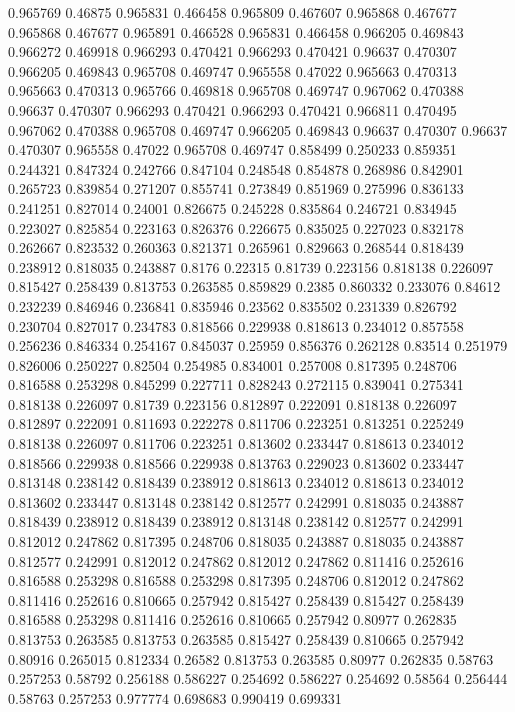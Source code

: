 0.965769 0.46875
0.965831 0.466458
0.965809 0.467607
0.965868 0.467677
0.965868 0.467677
0.965891 0.466528
0.965831 0.466458
0.966205 0.469843
0.966272 0.469918
0.966293 0.470421
0.966293 0.470421
0.96637 0.470307
0.966205 0.469843
0.965708 0.469747
0.965558 0.47022
0.965663 0.470313
0.965663 0.470313
0.965766 0.469818
0.965708 0.469747
0.967062 0.470388
0.96637 0.470307
0.966293 0.470421
0.966293 0.470421
0.966811 0.470495
0.967062 0.470388
0.965708 0.469747
0.966205 0.469843
0.96637 0.470307
0.96637 0.470307
0.965558 0.47022
0.965708 0.469747
0.858499 0.250233
0.859351 0.244321
0.847324 0.242766
0.847104 0.248548
0.854878 0.268986
0.842901 0.265723
0.839854 0.271207
0.855741 0.273849
0.851969 0.275996
0.836133 0.241251
0.827014 0.24001
0.826675 0.245228
0.835864 0.246721
0.834945 0.223027
0.825854 0.223163
0.826376 0.226675
0.835025 0.227023
0.832178 0.262667
0.823532 0.260363
0.821371 0.265961
0.829663 0.268544
0.818439 0.238912
0.818035 0.243887
0.8176 0.22315
0.81739 0.223156
0.818138 0.226097
0.815427 0.258439
0.813753 0.263585
0.859829 0.2385
0.860332 0.233076
0.84612 0.232239
0.846946 0.236841
0.835946 0.23562
0.835502 0.231339
0.826792 0.230704
0.827017 0.234783
0.818566 0.229938
0.818613 0.234012
0.857558 0.256236
0.846334 0.254167
0.845037 0.25959
0.856376 0.262128
0.83514 0.251979
0.826006 0.250227
0.82504 0.254985
0.834001 0.257008
0.817395 0.248706
0.816588 0.253298
0.845299 0.227711
0.828243 0.272115
0.839041 0.275341
0.818138 0.226097
0.81739 0.223156
0.812897 0.222091
0.818138 0.226097
0.812897 0.222091
0.811693 0.222278
0.811706 0.223251
0.813251 0.225249
0.818138 0.226097
0.811706 0.223251
0.813602 0.233447
0.818613 0.234012
0.818566 0.229938
0.818566 0.229938
0.813763 0.229023
0.813602 0.233447
0.813148 0.238142
0.818439 0.238912
0.818613 0.234012
0.818613 0.234012
0.813602 0.233447
0.813148 0.238142
0.812577 0.242991
0.818035 0.243887
0.818439 0.238912
0.818439 0.238912
0.813148 0.238142
0.812577 0.242991
0.812012 0.247862
0.817395 0.248706
0.818035 0.243887
0.818035 0.243887
0.812577 0.242991
0.812012 0.247862
0.812012 0.247862
0.811416 0.252616
0.816588 0.253298
0.816588 0.253298
0.817395 0.248706
0.812012 0.247862
0.811416 0.252616
0.810665 0.257942
0.815427 0.258439
0.815427 0.258439
0.816588 0.253298
0.811416 0.252616
0.810665 0.257942
0.80977 0.262835
0.813753 0.263585
0.813753 0.263585
0.815427 0.258439
0.810665 0.257942
0.80916 0.265015
0.812334 0.26582
0.813753 0.263585
0.80977 0.262835
0.58763 0.257253
0.58792 0.256188
0.586227 0.254692
0.586227 0.254692
0.58564 0.256444
0.58763 0.257253
0.977774 0.698683
0.990419 0.699331
